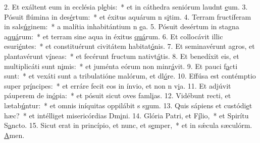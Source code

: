 2. Et exáltent eum in ecclésia pl\uline{e}bis:~* et in cáthedra seniórum laudnt \uline{e}um.
3. Pósuit flúmina in des\uline{é}rtum:~* et éxitus aquárum n s\uline{i}tim.
4. Terram fructíferam in sals\uline{ú}ginem:~* a malítia inhabitántium n \uline{e}a.
5. Pósuit desértum in stagna a\uline{quá}rum:~* et terram sine aqua in éxitus \uline{quá}rum.
6. Et collocávit illic esuri\uline{é}ntes:~* et constituérunt civitátem habitat\uline{ó}nis.
7. Et seminavérunt agros, et plantavérunt v\uline{í}neas:~* et fecérunt fructum nativt\uline{á}tis.
8. Et benedíxit eis, et multiplicáti sunt n\uline{i}mis:~* et juménta eórum non minr\uline{á}vit.
9. Et pauci f\uline{a}cti sunt:~* et vexáti sunt a tribulatióne malórum, et dl\uline{ó}re.
10. Effúsa est contémptio super pr\uline{í}ncipes:~* et erráre fecit eos in ínvio, et non n v\uline{i}a.
11. Et adjúvit páuperem de in\uline{ó}pia:~* et pósuit sicut oves faml\uline{i}as.
12. Vidébunt recti, et lætab\uline{ú}ntur:~* et omnis iníquitas oppilábit s s\uline{u}um.
13. Quis sápiens et custódi\uline{e}t hæc?~* et intélliget misericórdias Dm\uline{i}ni.
14. Glória Patri, et F\uline{í}lio,~* et Spirítu S\uline{a}ncto.
15. Sicut erat in princípio, et nunc, et s\uline{e}mper,~* et in sǽcula sæculórm. \uline{A}men.
